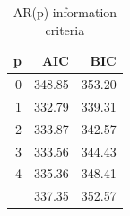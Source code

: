 \begin{table}

\caption{\label{tab:ar-arima-models}AR(p) information criteria}
\centering
\begin{tabular}[t]{rrr}
\toprule
p & AIC & BIC\\
\midrule
0 & 348.85 & 353.20\\
1 & 332.79 & 339.31\\
2 & 333.87 & 342.57\\
3 & 333.56 & 344.43\\
4 & 335.36 & 348.41\\
\addlinespace
5 & 337.35 & 352.57\\
\bottomrule
\end{tabular}
\end{table}
